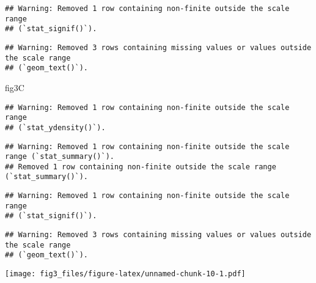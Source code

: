 \documentclass[
]{article}
\newenvironment{Shaded}{\begin{snugshade}}{\end{snugshade}}
\newcommand{\NormalTok}[1]{#1}
\begin{document}
\begin{verbatim}
## Warning: Removed 1 row containing non-finite outside the scale range
## (`stat_signif()`).
\end{verbatim}

\begin{verbatim}
## Warning: Removed 3 rows containing missing values or values outside the scale range
## (`geom_text()`).
\end{verbatim}

\begin{Shaded}
\begin{Highlighting}[]
\NormalTok{fig3C}
\end{Highlighting}
\end{Shaded}

\begin{verbatim}
## Warning: Removed 1 row containing non-finite outside the scale range
## (`stat_ydensity()`).
\end{verbatim}

\begin{verbatim}
## Warning: Removed 1 row containing non-finite outside the scale range (`stat_summary()`).
## Removed 1 row containing non-finite outside the scale range (`stat_summary()`).
\end{verbatim}

\begin{verbatim}
## Warning: Removed 1 row containing non-finite outside the scale range
## (`stat_signif()`).
\end{verbatim}

\begin{verbatim}
## Warning: Removed 3 rows containing missing values or values outside the scale range
## (`geom_text()`).
\end{verbatim}

\texttt{[image: fig3\_files/figure-latex/unnamed-chunk-10-1.pdf]}
\end{document}
